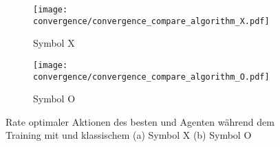 \begin{figure}
\centering
\begin{subfigure}[b]{0.75\textwidth}
    \centering
   \texttt{[image: convergence/convergence\_compare\_algorithm\_X.pdf]}
   \caption{Symbol X}
   \label{fig:convergence_compare_algorithm_X} 
\end{subfigure}

\begin{subfigure}[b]{0.75\textwidth}
    \centering
   \texttt{[image: convergence/convergence\_compare\_algorithm\_O.pdf]}
   \caption{Symbol O}
   \label{fig:convergence_compare_algorithm_O}
\end{subfigure}


\caption[Rate optimaler Aktionen bester \qlearning und \sarsa Agent, \wtable, klassisches \splay]{Rate optimaler Aktionen des besten \qlearning und \sarsa Agenten während dem Training mit \wtable und klassischem \splay (a) Symbol X (b) Symbol O}
\label{fig:convergence_compare_algorithm}
\end{figure}